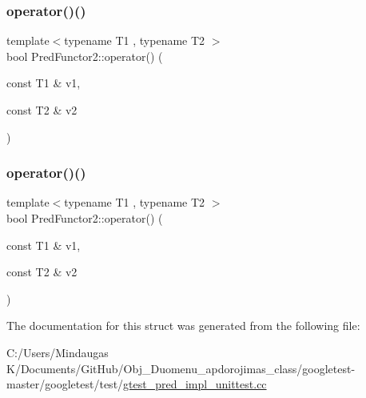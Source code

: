 \mbox{\label{struct_pred_functor2_a2142c86e4c0a3139e167dd3f13eb7f6f}} 
\subsubsection{\texorpdfstring{operator()()}{operator()()}\hspace{0.1cm}{\footnotesize\ttfamily [2/3]}}
{\footnotesize\ttfamily template$<$typename T1 , typename T2 $>$ \\
bool Pred\+Functor2\+::operator() (\begin{DoxyParamCaption}\item[{const T1 \&}]{v1,  }\item[{const T2 \&}]{v2 }\end{DoxyParamCaption})\hspace{0.3cm}{\ttfamily [inline]}}

\mbox{\label{struct_pred_functor2_a2142c86e4c0a3139e167dd3f13eb7f6f}} 
\subsubsection{\texorpdfstring{operator()()}{operator()()}\hspace{0.1cm}{\footnotesize\ttfamily [3/3]}}
{\footnotesize\ttfamily template$<$typename T1 , typename T2 $>$ \\
bool Pred\+Functor2\+::operator() (\begin{DoxyParamCaption}\item[{const T1 \&}]{v1,  }\item[{const T2 \&}]{v2 }\end{DoxyParamCaption})\hspace{0.3cm}{\ttfamily [inline]}}



The documentation for this struct was generated from the following file\+:\begin{DoxyCompactItemize}
\item 
C\+:/\+Users/\+Mindaugas K/\+Documents/\+Git\+Hub/\+Obj\+\_\+\+Duomenu\+\_\+apdorojimas\+\_\+class/googletest-\/master/googletest/test/\mbox{\hyperlink{googletest-master_2googletest_2test_2gtest__pred__impl__unittest_8cc}{gtest\+\_\+pred\+\_\+impl\+\_\+unittest.\+cc}}\end{DoxyCompactItemize}
